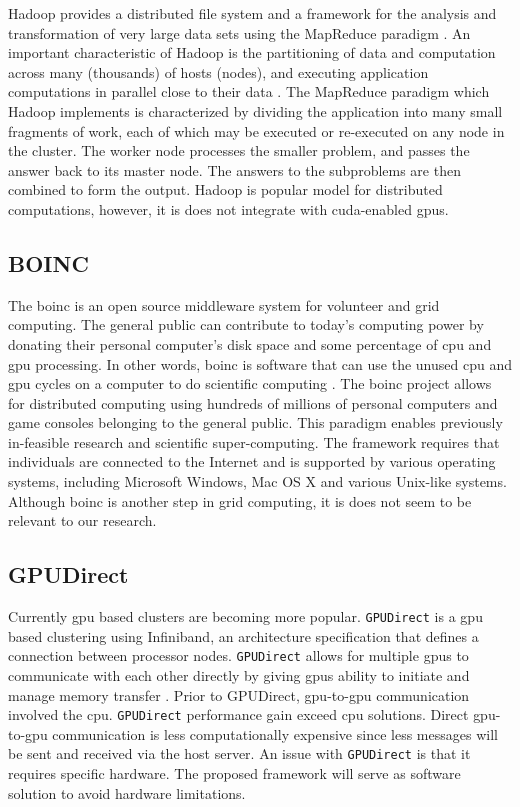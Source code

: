 Hadoop provides a distributed file system and a framework
for the analysis and transformation of very large data sets using the MapReduce
paradigm \cite{website:Apache-Hadoop} \cite{website:Apress} \cite{dias2011hpc}
\cite{dean2001mapreduce}. An important characteristic of Hadoop is the
partitioning of data and computation across many (thousands) of hosts (nodes),
and executing application computations in parallel close to their data
\cite{shvachko2011apache}. The MapReduce \cite{luo2011hierarchical}
\cite{website:Hadoop-Wiki-map} paradigm which Hadoop implements is
characterized by dividing the application into many small fragments of work,
each of which may be executed or re-executed on any node in the cluster. The
worker node processes the smaller problem, and passes the answer back to its
master node. The answers to the subproblems are then combined to form the
output. Hadoop is popular model for distributed computations, however, it is
does not integrate with \gls{cuda}-enabled \glspl{gpu}.

\subsection{BOINC}

The \Gls{boinc} is an open source middleware system for volunteer and grid
computing. The general public can contribute to today's computing power by
donating their personal computer's disk space and some percentage of \gls{cpu}
and \gls{gpu} processing. In other words, \gls{boinc} is software that can use
the unused \gls{cpu} and \gls{gpu} cycles on a computer to do scientific
computing \cite{anderson2004boinc}. The \gls{boinc} project allows for
distributed computing using hundreds of millions of personal computers and game
consoles belonging to the general public. This paradigm enables previously
in-feasible research and scientific super-computing. The framework requires
that individuals are connected to the Internet and is supported by various
operating systems, including Microsoft Windows, Mac OS X and various Unix-like
systems. Although \gls{boinc} is another step in grid computing, it is does
not seem to be relevant to our research.

\subsection{GPUDirect}

Currently \gls{gpu} based clusters are becoming more popular.
\texttt{GPUDirect} is a \gls{gpu} based clustering using Infiniband, an
architecture specification that defines a connection between processor nodes.
\texttt{GPUDirect} allows for multiple \glspl{gpu} to communicate with each
other directly by giving \glspl{gpu} ability to initiate and manage memory
transfer \cite{website:YouTube}. Prior to GPUDirect, \gls{gpu}-to-\gls{gpu}
communication involved the \gls{cpu}. \texttt{GPUDirect} performance gain
exceed \gls{cpu} solutions. Direct \gls{gpu}-to-\gls{gpu} communication is less
computationally expensive since less messages will be sent and received via the
host server. An issue with \texttt{GPUDirect} is that it requires specific
hardware. The proposed framework will serve as software solution to avoid
hardware limitations.


